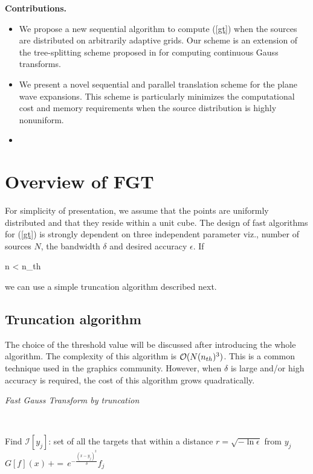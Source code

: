 \documentclass[conference]{IEEEtran}
\begin{document}
\textbf{Contributions.}
\begin{itemize} 
\item We propose a new sequential algorithm to compute (\ref{gt}) when the sources are distributed on arbitrarily adaptive grids. Our scheme is an extension of the tree-splitting scheme proposed in \cite{veerapaneni08} for computing continuous Gauss transforms. 
\item We present a novel sequential and parallel translation scheme for the plane wave expansions.
This scheme is particularly minimizes the computational cost and memory requirements 
when the source distribution is highly nonuniform. 
\item 
\end{itemize}


\section{Overview of FGT}
For simplicity of presentation, we assume that the points are uniformly distributed and that they reside within a unit cube.
The design of fast algorithms for (\ref{gt}) is strongly dependent on three independent parameter viz., number of sources $N$, the bandwidth $\delta$ and desired accuracy $\epsilon$.  If 

\beq n  < n_{th} \eeq 

we can use a simple truncation algorithm described next.
\subsection{Truncation algorithm} 
The choice of the threshold value will be discussed after introducing the whole algorithm. The complexity of this algorithm is $\mathcal{O}(N (n_{th})^3)$. This is a common technique used in the graphics community. However, when $\delta$ is large and/or high accuracy is required, the cost of this algorithm grows quadratically.  

\begin{algorithm}[!h]
\caption{\em Fast Gauss Transform by truncation}
\label{a:sfgt}
{\tt
\begin{algorithmic}
\STATE
    \STATE
    \STATE Find $\mathcal{I}[y_j]$: set of all the targets that within a distance $r = \sqrt{- \ln 
           \epsilon}$ from $y_j$
	 \STATE 
	     \STATE $G[f](x) \, += \, e^{-\frac{(x - y_j)^2}{\delta}} f_j$ \hfill 
    \ENDFOR
 \ENDFOR

\end{algorithmic}
}
\end{algorithm}
\end{document}
